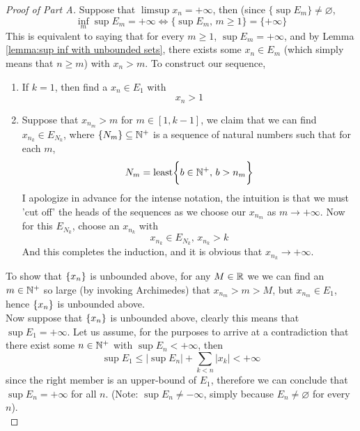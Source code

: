 \documentclass[../../main.tex]{subfiles}
\begin{document}
\begin{proof}[Proof of Part A]
    Suppose that $\limsup x_n = +\infty$, then (since $\{\sup E_m\}\neq\varnothing$,
    \[
    \inf_m \sup E_m = +\infty\iff \biggl\{\sup E_m,\,m\geq 1\biggr\}=\{+\infty\}
    \]
    This is equivalent to saying that for every $m\geq 1$, $\sup E_m = +\infty$, and by Lemma \ref{lemma:sup inf with unbounded sets}, there exists some $x_n\in E_m$ (which simply means that $n\geq m$) with $x_n>m$. To construct our sequence,
    \begin{enumerate}
        \item If $k=1$, then find a $x_n\in E_1$ with
        \[
        x_n > 1
        \]
        \item Suppose that $x_{n_m}>m$ for $m\in[1,k-1]$, we claim that we can find $x_{n_k}\in E_{N_k}$, where $\{N_m\}\subseteq\mathbb{N}^+$ is a sequence of natural numbers such that for each $m$,
        \[
        N_m = \mathrm{least}\biggl\{b\in\mathbb{N}^+,\,b>n_m\biggr\}
        \]
        I apologize in advance for the intense notation, the intuition is that we must 'cut off' the heads of the sequences as we choose our $x_{n_m}$ as $m\to +\infty$. Now for this $E_{N_k}$, choose an $x_{n_k}$ with
        \[
        x_{n_k}\in E_{N_k},\, x_{n_k}>k
        \]
        And this completes the induction, and it is obvious that $x_{n_k}\to+\infty$.
    \end{enumerate}
    To show that $\{x_n\}$ is unbounded above, for any $M\in\mathbb{R}$ we we can find an $m\in\mathbb{N}^+$ so large (by invoking Archimedes) that $x_{n_m}>m>M$, but $x_{n_m}\in E_1$, hence $\{x_n\}$ is unbounded above.\\
    
    Now suppose that $\{x_n\}$ is unbounded above, clearly this means that $\sup E_1 = +\infty$. Let us assume, for the purposes to arrive at a contradiction that there exist some $n\in\mathbb{N}^+$ with $\sup E_n <+\infty$, then
    \[
    \sup E_1\leq |\sup E_n| + \sum_{k<n}|x_k|<+\infty
    \]
    since the right member is an upper-bound of $E_1$, therefore we can conclude that $\sup E_n=+\infty$ for all $n$. (Note: $\sup E_n\neq -\infty$, simply because $E_n\neq\varnothing$ for every $n$).\\
    

\end{proof}
\end{document}

